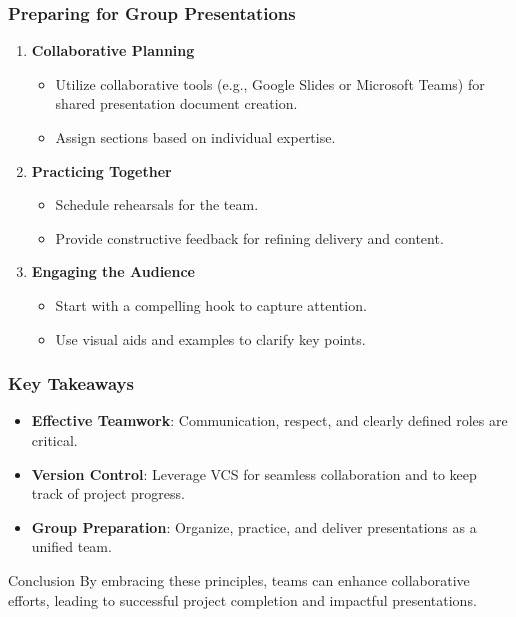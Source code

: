 \documentclass[aspectratio=169]{beamer}
\begin{document}
\begin{frame}[fragile]
    \frametitle{Preparing for Group Presentations}
    \begin{enumerate}
        \item \textbf{Collaborative Planning}
        \begin{itemize}
            \item Utilize collaborative tools (e.g., Google Slides or Microsoft Teams) for shared presentation document creation.
            \item Assign sections based on individual expertise.
        \end{itemize}
        
        \item \textbf{Practicing Together}
        \begin{itemize}
            \item Schedule rehearsals for the team.
            \item Provide constructive feedback for refining delivery and content.
        \end{itemize}
        
        \item \textbf{Engaging the Audience}
        \begin{itemize}
            \item Start with a compelling hook to capture attention.
            \item Use visual aids and examples to clarify key points.
        \end{itemize}
    \end{enumerate}
\end{frame}

\begin{frame}[fragile]
    \frametitle{Key Takeaways}
    \begin{itemize}
        \item \textbf{Effective Teamwork}: Communication, respect, and clearly defined roles are critical.
        \item \textbf{Version Control}: Leverage VCS for seamless collaboration and to keep track of project progress.
        \item \textbf{Group Preparation}: Organize, practice, and deliver presentations as a unified team.
    \end{itemize}
    \begin{block}{Conclusion}
        By embracing these principles, teams can enhance collaborative efforts, leading to successful project completion and impactful presentations.
    \end{block}
\end{frame}
\end{document}
